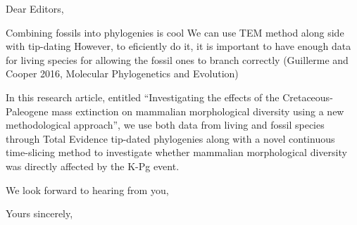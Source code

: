 \documentclass[11pt]{letter}
\begin{document}





\begin{letter}{}
\opening{Dear Editors,}

Combining fossils into phylogenies is cool
We can use TEM method along side with tip-dating
However, to eficiently do it, it is important to have enough data for living species for allowing the fossil ones to branch correctly (Guillerme and Cooper 2016, Molecular Phylogenetics and Evolution)

In this research article, entitled ``Investigating the effects of the Cretaceous-Paleogene mass extinction on mammalian morphological diversity using a new methodological approach'', we use both data from living and fossil species through Total Evidence tip-dated phylogenies along with a novel continuous time-slicing method to investigate whether mammalian morphological diversity was directly affected by the K-Pg event.

We look forward to hearing from you,

\closing{Yours sincerely,}


\end{letter}
\end{document}
